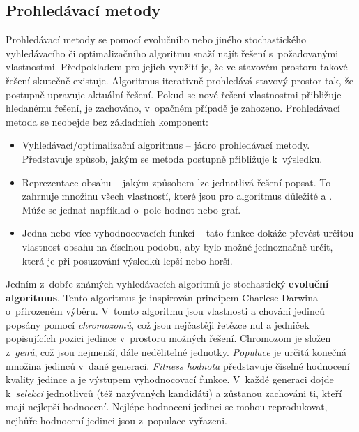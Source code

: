 
\subsection{Prohledávací metody}


Prohledávací metody se pomocí evolučního nebo jiného stochastického vyhledávacího či optimalizačního algoritmu snaží najít řešení s~požadovanými vlastnostmi.
Předpokladem pro jejich využití je, že ve stavovém prostoru takové řešení skutečně existuje.
Algoritmus iterativně prohledává stavový prostor tak, že postupně upravuje aktuální řešení.
Pokud se nové řešení vlastnostmi přibližuje hledanému řešení, je zachováno, v~opačném případě je zahozeno.
Prohledávací metoda se neobejde bez základních komponent:
\begin{itemize}
    \item Vyhledávací/optimalizační algoritmus -- jádro prohledávací metody. Představuje způsob, jakým se metoda postupně přibližuje k~výsledku.
    \item Reprezentace obsahu -- jakým způsobem lze jednotlivá řešení popsat. To zahrnuje množinu všech vlastností, které jsou pro algoritmus důležité a . Může se jednat například o~pole hodnot nebo graf.
    \item Jedna nebo více vyhodnocovacích funkcí -- tato funkce dokáže převést určitou vlastnost obsahu na číselnou podobu, aby bylo možné jednoznačně určit, která je při posuzování výsledků lepší nebo horší.
\end{itemize}
Jedním z~dobře známých vyhledávacích algoritmů je stochastický \textbf{evoluční algoritmus}.
Tento algoritmus je inspirován principem Charlese Darwina o~přirozeném výběru.
V~tomto algoritmu jsou vlastnosti a chování jedinců popsány pomocí \textit{chromozomů}, což jsou nejčastěji řetězce nul a jedniček popisujících pozici jedince v~prostoru možných řešení.
Chromozom je složen z~\textit{genů}, což jsou nejmenší, dále nedělitelné jednotky.
\textit{Populace} je určitá konečná množina jedinců v~dané generaci.
\textit{Fitness hodnota} představuje číselné hodnocení kvality jedince a je výstupem vyhodnocovací funkce.
V~každé generaci dojde k~\textit{selekci} jednotlivců (též nazývaných kandidáti) a zůstanou zachováni ti, kteří mají nejlepší hodnocení.
Nejlépe hodnocení jedinci se mohou reprodukovat, nejhůře hodnocení jedinci jsou z~populace vyřazeni.
